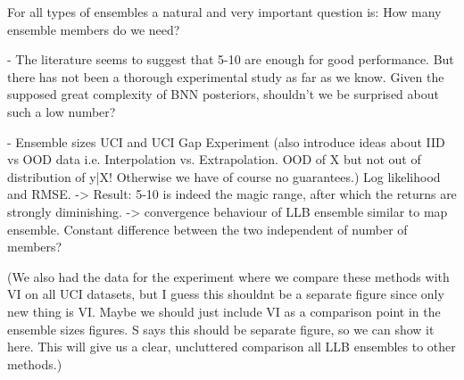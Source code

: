 \documentclass[../thesis.tex]{subfiles}
\begin{document}
For all types of ensembles a natural and very important question is: How many ensemble members do we need?

- The literature seems to suggest that 5-10 are enough for good performance. But there has not been a thorough experimental study as far as we know.
Given the supposed great complexity of BNN posteriors, shouldn't we be surprised about such a low number?

- Ensemble sizes UCI and UCI Gap Experiment (also introduce ideas about IID vs OOD data i.e. Interpolation vs. Extrapolation. OOD of X but not out of distribution of y|X! Otherwise we have of course no guarantees.) Log likelihood and RMSE.
-> Result: 5-10 is indeed the magic range, after which the returns are strongly diminishing.
-> convergence behaviour of LLB ensemble similar to map ensemble. Constant difference between the two independent of number of members?

(We also had the data for the experiment where we compare these methods with VI on all UCI datasets, but I guess this shouldnt be a separate figure since only new thing is VI. Maybe we should just include VI as a comparison point in the ensemble sizes figures. 
S says this should be separate figure, so we can show it here. This will give us a clear, uncluttered comparison all LLB ensembles to other methods.)





\end{document}
